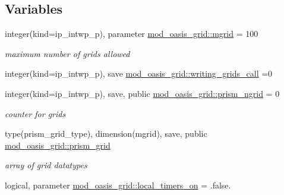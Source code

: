 \subsection*{Variables}
\begin{DoxyCompactItemize}
\item 
integer(kind=ip\+\_\+intwp\+\_\+p), parameter \hyperlink{namespacemod__oasis__grid_a9df267c5d7acbb73eb35d6aaf10ab59e}{mod\+\_\+oasis\+\_\+grid\+::mgrid} = 100
\begin{DoxyCompactList}\small\item\em maximum number of grids allowed \end{DoxyCompactList}\item 
integer(kind=ip\+\_\+intwp\+\_\+p), save \hyperlink{namespacemod__oasis__grid_a587c160986cc015e4367b1cca13babfb}{mod\+\_\+oasis\+\_\+grid\+::writing\+\_\+grids\+\_\+call} =0
\item 
integer(kind=ip\+\_\+intwp\+\_\+p), save, public \hyperlink{namespacemod__oasis__grid_ad6e65eb9872825ac98db6ce1f7dcd618}{mod\+\_\+oasis\+\_\+grid\+::prism\+\_\+ngrid} = 0
\begin{DoxyCompactList}\small\item\em counter for grids \end{DoxyCompactList}\item 
type(prism\+\_\+grid\+\_\+type), dimension(mgrid), save, public \hyperlink{namespacemod__oasis__grid_a43b75282e77fd687bd7173f4f78abcb1}{mod\+\_\+oasis\+\_\+grid\+::prism\+\_\+grid}
\begin{DoxyCompactList}\small\item\em array of grid datatypes \end{DoxyCompactList}\item 
logical, parameter \hyperlink{namespacemod__oasis__grid_a88908301f4dba06278e75e79f90b1155}{mod\+\_\+oasis\+\_\+grid\+::local\+\_\+timers\+\_\+on} = .false.
\end{DoxyCompactItemize}
